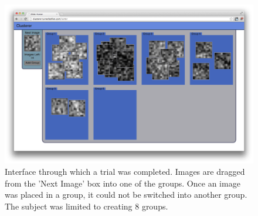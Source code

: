 \begin{figure}
\centering
\includegraphics[width=5.6in]{img/clusterer.png}
\caption{Interface through which a trial was completed. Images are dragged from
  the 'Next Image' box into one of the groups. Once an image was placed in a
  group, it could not be switched into another group.  The subject was limited
  to creating 8 groups.}
\label{fig:clusterer}
\end{figure}
